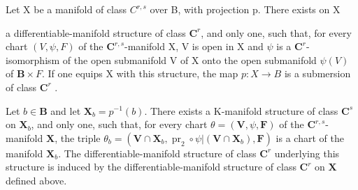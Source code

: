 Let X be a manifold of class \(C^{r,s}\) over B, with projection p. There exists on X

a differentiable-manifold structure of class \(\mathbf{C}^{r}\), and only one, such that, for every chart \((V,\psi,F)\) of the \(\mathbf{C}^{r,s}\)-manifold X, V is open in X and \(\psi\) is a \(\mathbf{C}^{r}\)-isomorphism of the open submanifold V of X onto the open submanifold \(\psi(V)\) of \(\mathbf{B}\times F\). If one equips X with this structure, the map \(p:X\to B\) is a submersion of class \(\mathbf{C}^{r}\) .

Let \(b \in \mathbf{B}\) and let \(\mathbf{X}_b = p^{-1}(b)\). There exists a K-manifold structure of class \(\mathbf{C}^s\) on \(\mathbf{X}_b\), and only one, such that, for every chart \(\theta = (\mathbf{V}, \psi, \mathbf{F})\) of the \(\mathbf{C}^{r,s}\)-manifold \(\mathbf{X}\), the triple \(\theta_b = (\mathbf{V} \cap \mathbf{X}_b, \operatorname{pr}_2 \circ \psi | (\mathbf{V} \cap \mathbf{X}_b), \mathbf{F})\) is a chart of the manifold \(\mathbf{X}_b\). The differentiable-manifold structure of class \(\mathbf{C}^r\) underlying this structure is induced by the differentiable-manifold structure of class \(\mathbf{C}^r\) on \(\mathbf{X}\) defined above.
